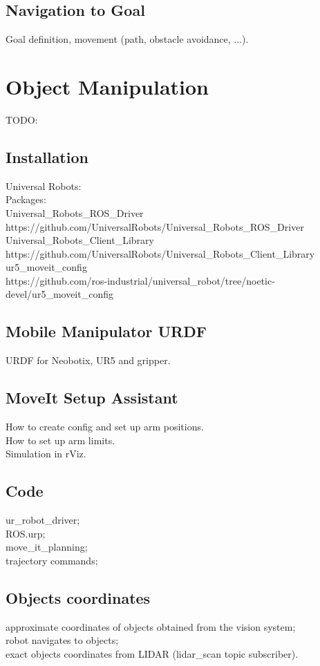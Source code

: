 \subsection{Navigation to Goal}
Goal definition, movement (path, obstacle avoidance, ...).

\section{Object Manipulation}
TODO:\\

\subsection{Installation}
Universal Robots:\\

Packages:\\
Universal\_Robots\_ROS\_Driver
https://github.com/UniversalRobots/Universal\_Robots\_ROS\_Driver\\

Universal\_Robots\_Client\_Library\\
https://github.com/UniversalRobots/Universal\_Robots\_Client\_Library\\

ur5\_moveit\_config\\
https://github.com/ros-industrial/universal\_robot/tree/noetic-devel/ur5\_moveit\_config\\



\subsection{Mobile Manipulator URDF}
URDF for Neobotix, UR5 and gripper.\\

\subsection{MoveIt Setup Assistant}
How to create config and set up arm positions.\\
How to set up arm limits.\\
Simulation in rViz.\\

\subsection{Code}
ur\_robot\_driver;\\
ROS.urp;\\
move\_it\_planning;\\
trajectory commands;\\

\subsection{Objects coordinates}
approximate coordinates of objects obtained from the vision system; \\
robot navigates to objects; \\
exact objects coordinates from LIDAR (lidar\_scan topic subscriber).\\










